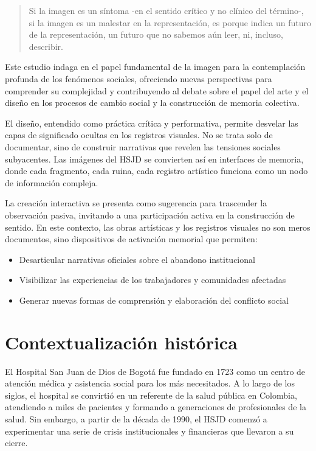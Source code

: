\begin{quote}
Si la imagen es un síntoma -en el sentido crítico y no clínico del término-, si la imagen es un malestar en la representación, es porque indica un futuro de la representación, un futuro que no sabemos aún leer, ni, incluso, describir. \parencite[p. 177]{DidiHuberman2011}
\end{quote}

Este estudio indaga en el papel fundamental de la imagen para la contemplación profunda de los fenómenos sociales, ofreciendo nuevas perspectivas para comprender su complejidad y contribuyendo al debate sobre el papel del arte y el diseño en los procesos de cambio social y la construcción de memoria colectiva.

El diseño, entendido como práctica crítica y performativa, permite desvelar las capas de significado ocultas en los registros visuales. No se trata solo de documentar, sino de construir narrativas que revelen las tensiones sociales subyacentes. Las imágenes del HSJD se convierten así en interfaces de memoria, donde cada fragmento, cada ruina, cada registro artístico funciona como un nodo de información compleja.

La creación interactiva se presenta como sugerencia para trascender la observación pasiva, invitando a una participación activa en la construcción de sentido. En este contexto, las obras artísticas y los registros visuales no son meros documentos, sino dispositivos de activación memorial que permiten:

\begin{itemize}
    \item Desarticular narrativas oficiales sobre el abandono institucional
    \item Visibilizar las experiencias de los trabajadores y comunidades afectadas
    \item Generar nuevas formas de comprensión y elaboración del conflicto social
\end{itemize}

\section*{Contextualización histórica}

El Hospital San Juan de Dios de Bogotá fue fundado en 1723 como un centro de atención médica y asistencia social para los más necesitados. A lo largo de los siglos, el hospital se convirtió en un referente de la salud pública en Colombia, atendiendo a miles de pacientes y formando a generaciones de profesionales de la salud. Sin embargo, a partir de la década de 1990, el HSJD comenzó a experimentar una serie de crisis institucionales y financieras que llevaron a su cierre.

